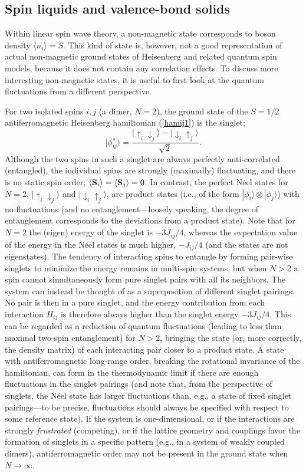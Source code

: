 \documentclass[draft,numberedheadings]{aipproc}
\newcommand{\dn}{\downarrow}
\newcommand{\up}{\uparrow}
\begin{document}
\subsection{Spin liquids and valence-bond solids}
\label{vbsrvb}

Within linear spin wave theory, a non-magnetic state corresponds to boson density $\langle n_i\rangle = S$. This kind of state is, however, not
a good representation of actual non-magnetic ground states of Heisenberg and related quantum spin models, because it does not contain any correlation 
effects. To discuss more interesting non-magnetic states, it is useful to first look at the quantum fluctuations from a different 
perspective. 

For two isolated spins $i,j$ (a dimer, $N=2$), the ground state of the $S=1/2$ antiferromagnetic Heisenberg hamiltonian (\ref{hamij1})
is the singlet; 
\begin{equation}
|\phi^s_{ij}\rangle = \frac{|{\up}_i{\dn}_j\rangle - |{\dn}_i{\up}_j\rangle}{\sqrt{2}}.
\label{singeltij}
\end{equation}
Although the two spins in such a singlet are always perfectly anti-correlated (entangled), the individual spins are strongly (maximally) fluctuating, 
and there is no static spin order; $\langle {\bf S}_i\rangle=\langle {\bf S}_j\rangle=0$. In contrast, the perfect N\'eel states for $N=2$, 
$|{\up}_i{\dn}_j\rangle$ and $|{\dn}_i{\up}_j\rangle$, are product states (i.e., of the form $|\phi_i\rangle \otimes |\phi_j\rangle$) with no fluctuations 
(and no entanglement---loosely speaking, the degree of entanglement corresponds to the deviations from a product state). Note that for $N=2$ the (eigen) 
energy of the singlet is $-3J_{ij}/4$, whereas the expectation value of the energy in the N\'eel states is much higher, $-J_{ij}/4$ (and the states are not 
eigenstates). The tendency of interacting spins to entangle by forming pair-wise singlets to minimize the energy remains in multi-spin systems, but when 
$N>2$ a spin cannot simultaneously form pure singlet pairs with all its neighbors. The system can instead be thought of as a superposition of 
different singlet pairings. No pair is then in a pure singlet, and the energy contribution from each interaction $H_{ij}$ is therefore always higher 
than the singlet energy $-3J_{ij}/4$. This can be regarded as a reduction of quantum fluctuations (leading to less than maximal two-spin entanglement) for 
$N>2$, bringing the state (or, more correctly, the density matrix) of each interacting pair closer to a product state. A state with antiferromagnetic long-range 
order, breaking the rotational invariance of the hamiltonian, can form in the thermodynamic limit if there are enough fluctuations in the singlet pairings 
(and note that, from the perspective of singlets, the N\'eel state has larger fluctuations than, e.g., a state of fixed singlet pairings---to be precise, 
fluctuations should always be specified with respect to some reference state). If the system is one-dimensional, or if the interactions are strongly 
{\it frustrated} (competing), or if the lattice geometry and couplings favor the formation of singlets in a specific pattern (e.g., in a system of weakly 
coupled dimers), antiferromagnetic order may not be present in the ground state when $N\to \infty$.
\end{document}
